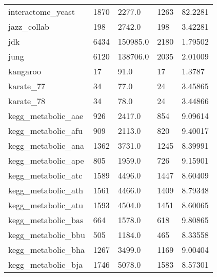 \begin{longtable}{lllll}
 interactome\_yeast                                  & 1870       & 2277.0      & 1263  & 82.2281    \\
 jazz\_collab                                        & 198        & 2742.0      & 198   & 3.42281    \\
 jdk                                                & 6434       & 150985.0    & 2180  & 1.79502    \\
 jung                                               & 6120       & 138706.0    & 2035  & 2.01009    \\
 kangaroo                                           & 17         & 91.0        & 17    & 1.3787     \\
 karate\_77                                          & 34         & 77.0        & 24    & 3.45865    \\
 karate\_78                                          & 34         & 78.0        & 24    & 3.44866    \\
 kegg\_metabolic\_aae                                 & 926        & 2417.0      & 854   & 9.09614    \\
 kegg\_metabolic\_afu                                 & 909        & 2113.0      & 820   & 9.40017    \\
 kegg\_metabolic\_ana                                 & 1362       & 3731.0      & 1245  & 8.39991    \\
 kegg\_metabolic\_ape                                 & 805        & 1959.0      & 726   & 9.15901    \\
 kegg\_metabolic\_atc                                 & 1589       & 4496.0      & 1447  & 8.60409    \\
 kegg\_metabolic\_ath                                 & 1561       & 4466.0      & 1409  & 8.79348    \\
 kegg\_metabolic\_atu                                 & 1593       & 4504.0      & 1451  & 8.60065    \\
 kegg\_metabolic\_bas                                 & 664        & 1578.0      & 618   & 9.80865    \\
 kegg\_metabolic\_bbu                                 & 505        & 1184.0      & 465   & 8.33558    \\
 kegg\_metabolic\_bha                                 & 1267       & 3499.0      & 1169  & 9.00404    \\
 kegg\_metabolic\_bja                                 & 1746       & 5078.0      & 1583  & 8.57301    \\

\end{longtable}
